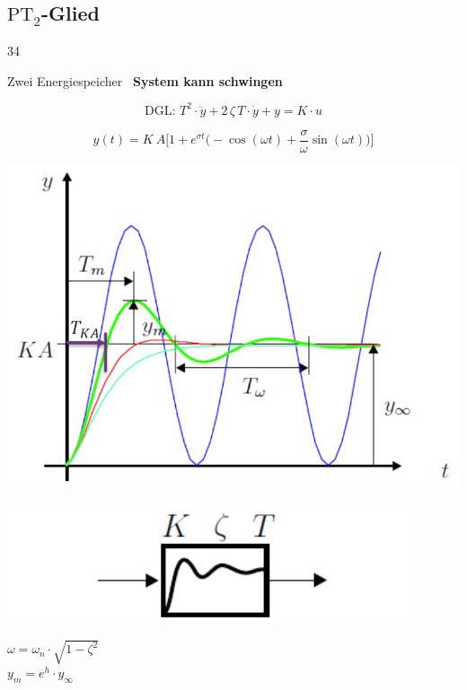 \subsection{$\text{PT}_2$-Glied}{34}

Zwei Energiespeicher \textrightarrow\ \textbf{System kann schwingen}

\begin{minipage}{0.4\columnwidth}
    $$ \boxed{ \text{DGL: } T^2 \cdot  \ddot{y} + 2 \, \zeta \, T \cdot \dot{y} + y = K \cdot u } $$
\end{minipage}
\hfill
\begin{minipage}{0.58\columnwidth}
    $$ \boxed{ y(t) = K \: A \big[ 1 + e^{\sigma t} \big( - \cos(\omega t) + \frac{\sigma}{\omega} \sin(\omega t)  \big)  \big] }  $$
\end{minipage}


\begin{minipage}{0.55\columnwidth}
    \includegraphics[width=\columnwidth]{images/pT2_sprungantwort}
\end{minipage}
\hfill
\begin{minipage}{0.38\columnwidth}
    \includegraphics[width=0.75\columnwidth]{images/pT2_symbol} 

    \begin{center}
        $ \omega = \omega_n \cdot \sqrt{1 - \zeta^2} $ \\
        $y_m = e^h \cdot y_{\infty}$ \\
    \end{center}
\end{minipage}


